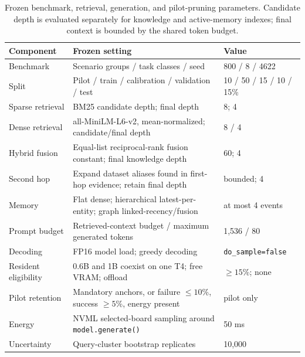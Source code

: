 \begin{table}[t]
\caption{Frozen benchmark, retrieval, generation, and pilot-pruning parameters. Candidate depth is evaluated separately for knowledge and active-memory indexes; final context is bounded by the shared token budget.}
\label{tab:frozen-parameters}
\centering
\small
\begin{tabularx}{\textwidth}{@{}lXl@{}}
\toprule
Component & Frozen setting & Value \\
\midrule
Benchmark & Scenario groups / task classes / seed & 800 / 8 / 4622 \\
Split & Pilot / train / calibration / validation / test & 10 / 50 / 15 / 10 / 15\% \\
Sparse retrieval & BM25 candidate depth; final depth & 8; 4 \\
Dense retrieval & all-MiniLM-L6-v2, mean-normalized; candidate/final depth & 8 / 4 \\
Hybrid fusion & Equal-list reciprocal-rank fusion constant; final knowledge depth & 60; 4 \\
Second hop & Expand dataset aliases found in first-hop evidence; retain final depth & bounded; 4 \\
Memory & Flat dense; hierarchical latest-per-entity; graph linked-recency/fusion & at most 4 events \\
Prompt budget & Retrieved-context budget / maximum generated tokens & 1,536 / 80 \\
Decoding & FP16 model load; greedy decoding & \texttt{do\_sample=false} \\
Resident eligibility & 0.6B and 1B coexist on one T4; free VRAM; offload & $\geq15$\%; none \\
Pilot retention & Mandatory anchors, or failure $\leq10$\%, success $\geq5$\%, energy present & pilot only \\
Energy & NVML selected-board sampling around \texttt{model.generate()} & 50 ms \\
Uncertainty & Query-cluster bootstrap replicates & 10,000 \\
\bottomrule
\end{tabularx}
\end{table}
